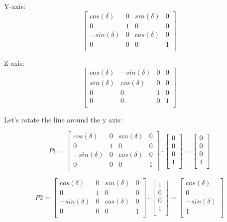 \documentclass[12pt]{report} \usepackage{preamble}
\begin{document}
Y-axis: \[
	\begin{bmatrix}
		cos(\delta)  & 0 & sin(\delta) & 0 \\
		0            & 1 & 0           & 0 \\
		-sin(\delta) & 0 & cos(\delta) & 0 \\
		0            & 0 & 0           & 1 \\
	\end{bmatrix}
\]

Z-axis: \[
	\begin{bmatrix}
		cos(\delta) & -sin(\delta) & 0 & 0 \\
		sin(\delta) & cos(\delta)  & 0 & 0 \\
		0           & 0            & 1 & 0 \\
		0           & 0            & 0 & 1 \\
	\end{bmatrix}
\]

Let's rotate the line around the y axis:

\[
	P1 =
	\begin{bmatrix}
		cos(\delta)  & 0 & sin(\delta) & 0 \\
		0            & 1 & 0           & 0 \\
		-sin(\delta) & 0 & cos(\delta) & 0 \\
		0            & 0 & 0           & 1 \\
	\end{bmatrix}
	\cdot
	\begin{bmatrix}
		0 \\
		0 \\
		0 \\
		1 \\
	\end{bmatrix}
	=
	\begin{bmatrix}
		0 \\
		0 \\
		0 \\
		1 \\
	\end{bmatrix}
\]

\[
	P2 =
	\begin{bmatrix}
		cos(\delta)  & 0 & sin(\delta) & 0 \\
		0            & 1 & 0           & 0 \\
		-sin(\delta) & 0 & cos(\delta) & 0 \\
		0            & 0 & 0           & 1 \\
	\end{bmatrix}
	\cdot
	\begin{bmatrix}
		1 \\
		0 \\
		0 \\
		1 \\
	\end{bmatrix}
	=
	\begin{bmatrix}
		cos(\delta)  \\
		0            \\
		-sin(\delta) \\
		1            \\
	\end{bmatrix}
\]
\end{document}
